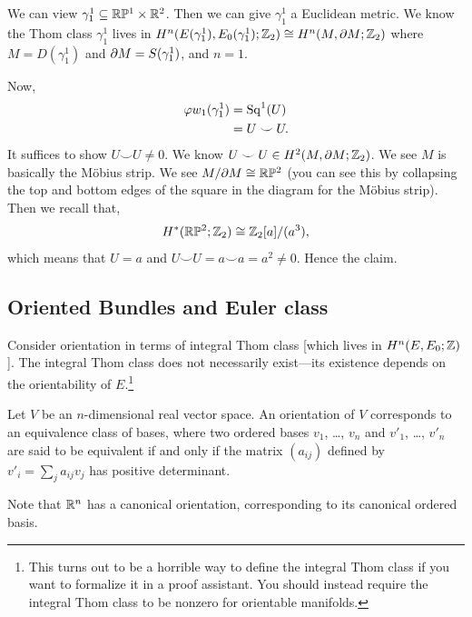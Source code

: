 \begin{Proof}
We can view $\gamma^{1}_{1}\subseteq\mathbb{R}\mathbb{P}^{1}\times\mathbb{R}^{2}$. Then we can
give $\gamma^{1}_{1}$ a Euclidean metric. We know the Thom class
$\gamma^{1}_{1}$ lives in
$H^{n}(E(\gamma^{1}_{1}),E_{0}(\gamma^{1}_{1});\mathbb{Z}_{2})\cong H^{n}(M,\partial M;\mathbb{Z}_{2})$
where $M=D(\gamma^{1}_{1})$ and $\partial M=S(\gamma^{1}_{1})$, and $n=1$.

Now,
\begin{subequations}
  \begin{align}
\varphi w_{1}(\gamma^{1}_{1}) &= \operatorname{Sq}^{1}(U)\\
&= U\smile U.
  \end{align}
\end{subequations}
It suffices to show $U\smile U\neq0$. We know $U\smile U\in H^{2}(M,\partial M;\mathbb{Z}_{2})$.
We see $M$ is basically the M\"{o}bius strip. We see $M/\partial M\cong\mathbb{R}\mathbb{P}^{2}$
(you can see this by collapsing the top and bottom edges of the square
in the diagram for the M\"{o}bius strip). Then we recall that,
\begin{equation}
H^{*}(\mathbb{R}\mathbb{P}^{2};\mathbb{Z}_{2})\cong\mathbb{Z}_{2}[a]/(a^{3}),
\end{equation}
which means that $U=a$ and $U\smile U=a\smile a=a^{2}\neq0$. Hence the claim.
\end{Proof}

\subsection{Oriented Bundles and Euler class}


\begin{node}
Consider orientation in terms of integral Thom class [which lives in $H^{n}(E,E_{0};\mathbb{Z})$].
The integral Thom class does not necessarily exist---its existence
depends on the orientability of $E$.\footnote{This turns out to be a
horrible way to define the integral Thom class if you want to
formalize it in a proof assistant. You should instead require the
integral Thom class to be nonzero for orientable manifolds.}
\end{node}

\begin{recall}
Let $V$ be an $n$-dimensional real vector space. An orientation of $V$
corresponds to an equivalence class of bases, where two ordered bases
$v_{1}$, \dots, $v_{n}$ and $v'_{1}$, \dots, $v'_{n}$ are said to be
equivalent if and only if the matrix $(a_{ij})$ defined by
$v'_{i}=\sum_{j}a_{ij}v_{j}$ has positive determinant.

Note that $\mathbb{R}^{n}$ has a canonical orientation, corresponding to its
canonical ordered basis.
\end{recall}

